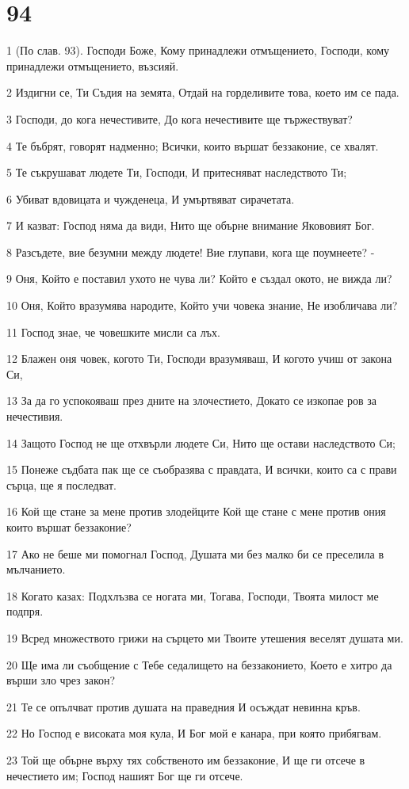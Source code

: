 \chapter{94}

\par 1 (По слав. 93). Господи Боже, Кому принадлежи отмъщението, Господи, кому принадлежи отмъщението, възсияй.
\par 2 Издигни се, Ти Съдия на земята, Отдай на горделивите това, което им се пада.
\par 3 Господи, до кога нечестивите, До кога нечестивите ще тържествуват?
\par 4 Те бъбрят, говорят надменно; Всички, които вършат беззаконие, се хвалят.
\par 5 Те съкрушават людете Ти, Господи, И притесняват наследството Ти;
\par 6 Убиват вдовицата и чужденеца, И умъртвяват сирачетата.
\par 7 И казват: Господ няма да види, Нито ще обърне внимание Якововият Бог.
\par 8 Разсъдете, вие безумни между людете! Вие глупави, кога ще поумнеете? -
\par 9 Оня, Който е поставил ухото не чува ли? Който е създал окото, не вижда ли?
\par 10 Оня, Който вразумява народите, Който учи човека знание, Не изобличава ли?
\par 11 Господ знае, че човешките мисли са лъх.
\par 12 Блажен оня човек, когото Ти, Господи вразумяваш, И когото учиш от закона Си,
\par 13 За да го успокояваш през дните на злочестието, Докато се изкопае ров за нечестивия.
\par 14 Защото Господ не ще отхвърли людете Си, Нито ще остави наследството Си;
\par 15 Понеже съдбата пак ще се съобразява с правдата, И всички, които са с прави сърца, ще я последват.
\par 16 Кой ще стане за мене против злодейците Кой ще стане с мене против ония които вършат беззаконие?
\par 17 Ако не беше ми помогнал Господ, Душата ми без малко би се преселила в мълчанието.
\par 18 Когато казах: Подхлъзва се ногата ми, Тогава, Господи, Твоята милост ме подпря.
\par 19 Всред множеството грижи на сърцето ми Твоите утешения веселят душата ми.
\par 20 Ще има ли съобщение с Тебе седалището на беззаконието, Което е хитро да върши зло чрез закон?
\par 21 Те се опълчват против душата на праведния И осъждат невинна кръв.
\par 22 Но Господ е високата моя кула, И Бог мой е канара, при която прибягвам.
\par 23 Той ще обърне върху тях собственото им беззаконие, И ще ги отсече в нечестието им; Господ нашият Бог ще ги отсече.

